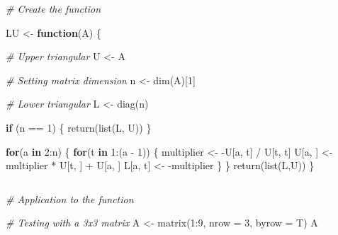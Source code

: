 \documentclass[
]{article}
\newenvironment{Shaded}{\begin{snugshade}}{\end{snugshade}}
\newcommand{\AttributeTok}[1]{\textcolor[rgb]{0.77,0.63,0.00}{#1}}
\newcommand{\CommentTok}[1]{\textcolor[rgb]{0.56,0.35,0.01}{\textit{#1}}}
\newcommand{\ControlFlowTok}[1]{\textcolor[rgb]{0.13,0.29,0.53}{\textbf{#1}}}
\newcommand{\DecValTok}[1]{\textcolor[rgb]{0.00,0.00,0.81}{#1}}
\newcommand{\FunctionTok}[1]{\textcolor[rgb]{0.00,0.00,0.00}{#1}}
\newcommand{\NormalTok}[1]{#1}
\newcommand{\OtherTok}[1]{\textcolor[rgb]{0.56,0.35,0.01}{#1}}
\newcommand{\SpecialCharTok}[1]{\textcolor[rgb]{0.00,0.00,0.00}{#1}}
\begin{document}
\begin{Shaded}
\begin{Highlighting}[]
\CommentTok{\# Create the function}

\NormalTok{LU }\OtherTok{\textless{}{-}} \ControlFlowTok{function}\NormalTok{(A) \{}
 
\CommentTok{\# Upper triangular}
\NormalTok{  U }\OtherTok{\textless{}{-}}\NormalTok{ A}
  
\CommentTok{\# Setting matrix dimension}
\NormalTok{  n }\OtherTok{\textless{}{-}} \FunctionTok{dim}\NormalTok{(A)[}\DecValTok{1}\NormalTok{]}
  
\CommentTok{\# Lower triangular}
\NormalTok{  L }\OtherTok{\textless{}{-}} \FunctionTok{diag}\NormalTok{(n)}
  
  
  \ControlFlowTok{if}\NormalTok{ (n }\SpecialCharTok{==} \DecValTok{1}\NormalTok{) \{}
    \FunctionTok{return}\NormalTok{(}\FunctionTok{list}\NormalTok{(L, U))}
\NormalTok{  \}}
  
  \ControlFlowTok{for}\NormalTok{(a }\ControlFlowTok{in} \DecValTok{2}\SpecialCharTok{:}\NormalTok{n) \{}
    \ControlFlowTok{for}\NormalTok{(t }\ControlFlowTok{in} \DecValTok{1}\SpecialCharTok{:}\NormalTok{(a }\SpecialCharTok{{-}} \DecValTok{1}\NormalTok{)) \{}
\NormalTok{      multiplier }\OtherTok{\textless{}{-}} \SpecialCharTok{{-}}\NormalTok{U[a, t] }\SpecialCharTok{/}\NormalTok{ U[t, t]}
\NormalTok{      U[a, ] }\OtherTok{\textless{}{-}}\NormalTok{ multiplier }\SpecialCharTok{*}\NormalTok{ U[t, ] }\SpecialCharTok{+}\NormalTok{ U[a, ]}
\NormalTok{      L[a, t] }\OtherTok{\textless{}{-}} \SpecialCharTok{{-}}\NormalTok{multiplier}
\NormalTok{    \}}
\NormalTok{  \}}
  \FunctionTok{return}\NormalTok{(}\FunctionTok{list}\NormalTok{(L,U))}
\NormalTok{\}}
\end{Highlighting}
\end{Shaded}

\(~\)

\begin{Shaded}
\begin{Highlighting}[]
\CommentTok{\# Application to the function}

\CommentTok{\# Testing with a 3x3 matrix}
\NormalTok{A }\OtherTok{\textless{}{-}} \FunctionTok{matrix}\NormalTok{(}\DecValTok{1}\SpecialCharTok{:}\DecValTok{9}\NormalTok{, }\AttributeTok{nrow =} \DecValTok{3}\NormalTok{, }\AttributeTok{byrow =}\NormalTok{ T)}
\NormalTok{A}
\end{Highlighting}
\end{Shaded}
\end{document}
